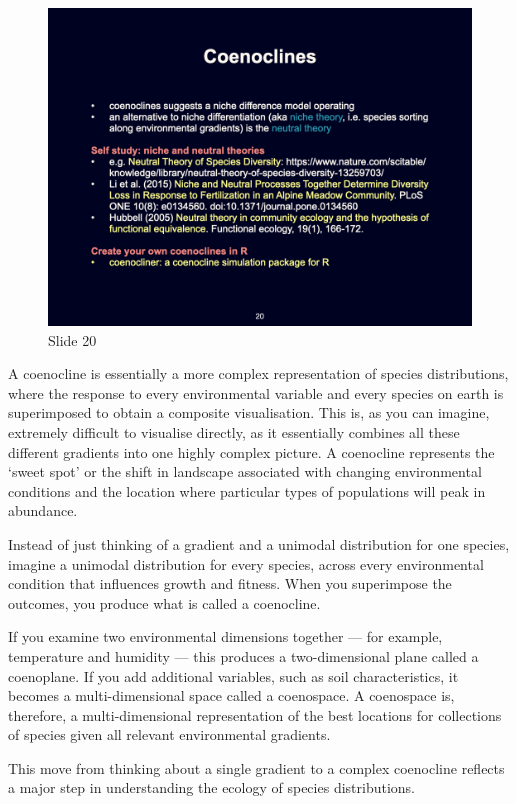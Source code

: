 \documentclass[
  12pt,
]{book}
\begin{document}
\begin{figure}[ht]
\centering
\includegraphics[width=0.8\linewidth]{../images/BDC334/BDC334-020.jpeg}
\caption*{Slide 20}
\end{figure}

A coenocline is essentially a more complex representation of species
distributions, where the response to every environmental variable and
every species on earth is superimposed to obtain a composite
visualisation. This is, as you can imagine, extremely difficult to
visualise directly, as it essentially combines all these different
gradients into one highly complex picture. A coenocline represents the
`sweet spot' or the shift in landscape associated with changing
environmental conditions and the location where particular types of
populations will peak in abundance.

Instead of just thinking of a gradient and a unimodal distribution for
one species, imagine a unimodal distribution for every species, across
every environmental condition that influences growth and fitness. When
you superimpose the outcomes, you produce what is called a coenocline.

If you examine two environmental dimensions together --- for example,
temperature and humidity --- this produces a two-dimensional plane
called a coenoplane. If you add additional variables, such as soil
characteristics, it becomes a multi-dimensional space called a
coenospace. A coenospace is, therefore, a multi-dimensional
representation of the best locations for collections of species given
all relevant environmental gradients.

This move from thinking about a single gradient to a complex coenocline
reflects a major step in understanding the ecology of species
distributions.
\end{document}
